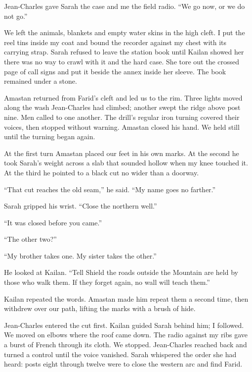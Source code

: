 Jean-Charles gave Sarah the case and me the field radio. ``We go now, or we do not go.''\par

We left the animals, blankets and empty water skins in the high cleft. I put the reel tins inside my coat and bound the recorder against my chest with its carrying strap. Sarah refused to leave the station book until Kailan showed her there was no way to crawl with it and the hard case. She tore out the crossed page of call signs and put it beside the annex inside her sleeve. The book remained under a stone.\par

Amastan returned from Farid's cleft and led us to the rim. Three lights moved along the wash Jean-Charles had climbed; another swept the ridge above post nine. Men called to one another. The drill's regular iron turning covered their voices, then stopped without warning. Amastan closed his hand. We held still until the turning began again.\par

At the first turn Amastan placed our feet in his own marks. At the second he took Sarah's weight across a slab that sounded hollow when my knee touched it. At the third he pointed to a black cut no wider than a doorway.\par

``That cut reaches the old seam,'' he said. ``My name goes no farther.''\par

Sarah gripped his wrist. ``Close the northern well.''\par

``It was closed before you came.''\par

``The other two?''\par

``My brother takes one. My sister takes the other.''\par

He looked at Kailan. ``Tell Shield the roads outside the Mountain are held by those who walk them. If they forget again, no wall will teach them.''\par

Kailan repeated the words. Amastan made him repeat them a second time, then withdrew over our path, lifting the marks with a brush of hide.\par

Jean-Charles entered the cut first. Kailan guided Sarah behind him; I followed. We moved on elbows where the roof came down. The radio against my ribs gave a burst of French through its cloth. We stopped. Jean-Charles reached back and turned a control until the voice vanished. Sarah whispered the order she had heard: posts eight through twelve were to close the western arc and find Farid.\par

